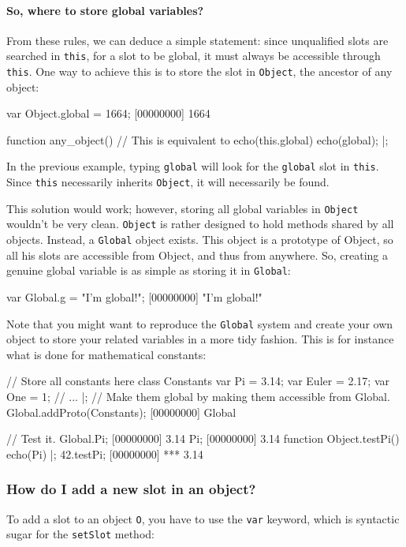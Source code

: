 \paragraph{So, where to store global variables?}
From these rules, we can deduce a simple statement: since unqualified
slots are searched in \lstinline|this|, for a slot to be global, it
must always be accessible through \lstinline|this|. One way to achieve
this is to store the slot in \lstinline|Object|, the ancestor of any
object:

\begin{urbiscript}
var Object.global = 1664;
[00000000] 1664

function any_object()
{
  // This is equivalent to echo(this.global)
  echo(global);
}|;
\end{urbiscript}

In the previous example, typing \lstinline|global| will look for the
\lstinline|global| slot in \lstinline|this|. Since \lstinline|this|
necessarily inherits \lstinline|Object|, it will necessarily be found.

This solution would work; however, storing all global variables in
\lstinline|Object| wouldn't be very clean. \lstinline|Object| is
rather designed to hold methods shared by all objects. Instead, a
\lstinline|Global| object exists. This object is a prototype of
Object, so all his slots are accessible from Object, and thus from
anywhere. So, creating a genuine global variable is as simple as
storing it in \lstinline|Global|:

\begin{urbiscript}
var Global.g = "I'm global!";
[00000000] "I'm global!"
\end{urbiscript}

Note that you might want to reproduce the \lstinline|Global| system
and create your own object to store your related variables in a more
tidy fashion. This is for instance what is done for mathematical
constants:

\begin{urbiscript}
// Store all constants here
class Constants
{
  var Pi = 3.14;
  var Euler = 2.17;
  var One = 1;
  // ...
}|;
// Make them global by making them accessible from Global.
Global.addProto(Constants);
[00000000] Global

// Test it.
Global.Pi;
[00000000] 3.14
Pi;
[00000000] 3.14
function Object.testPi() { echo(Pi) }|;
42.testPi;
[00000000] *** 3.14
\end{urbiscript}

\subsubsection{How do I add a new slot in an object?}
To add a slot to an object \lstinline{O}, you have to use the
\lstinline{var} keyword, which is syntactic sugar for the
\lstinline{setSlot} method:

